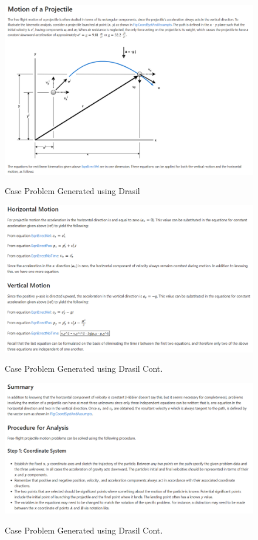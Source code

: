 \begin{figure}[h!]
	\caption{Case Problem Generated using Drasil}
	\includegraphics[width=1\textwidth]{figures/caseProb-1.png}
	\label{fig:caseProb-1}
\end{figure}

\begin{figure}[h!]
	\caption{Case Problem Generated using Drasil Cont.}
	\includegraphics[width=1\textwidth]{figures/caseProb-2.png}
	\label{fig:caseProb-2}
\end{figure}

\begin{figure}[h!]
	\caption{Case Problem Generated using Drasil Cont.}
	\includegraphics[width=1\textwidth]{figures/caseProb-3.png}
	\label{fig:caseProb-3}
\end{figure}

